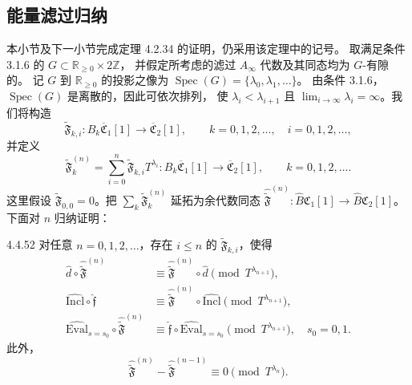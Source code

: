 \subsection{能量滤过归纳}
\label{subsec:4-4-6}

本小节及下一小节完成定理 4.2.34 的证明，仍采用该定理中的记号。
取满足条件 3.1.6 的 $G\subset\mathbb R_{\geq0}\times2\mathbb Z$，
并假定所考虑的滤过 $A_\infty$ 代数及其同态均为 $G$-有隙的。
记 $G$ 到 $\mathbb R_{\geq0}$ 的投影之像为
$\operatorname{Spec}(G)=\{\lambda_0,\lambda_1,\ldots\}$。
由条件 3.1.6，$\operatorname{Spec}(G)$ 是离散的，因此可依次排列，
使 $\lambda_i<\lambda_{i+1}$ 且
$\lim_{i\to\infty}\lambda_i=\infty$。我们将构造
\[
 \widetilde{\mathfrak F}_{k,i}\colon
 B_k\overline{\mathfrak C}_1[1]
 \longrightarrow\overline{\mathfrak C}_2[1],
 \qquad k=0,1,2,\ldots,\quad i=0,1,2,\ldots,
\]
并定义
\[
 \widetilde{\mathfrak F}^{(n)}_k
 =\sum_{i=0}^{n}\widetilde{\mathfrak F}_{k,i}T^{\lambda_i}
 \colon B_k\overline{\mathfrak C}_1[1]
 \longrightarrow\overline{\mathfrak C}_2[1],
 \qquad k=0,1,2,\ldots.
\]
这里假设 $\widetilde{\mathfrak F}_{0,0}=0$。把
$\sum_k\widetilde{\mathfrak F}^{(n)}_k$ 延拓为余代数同态
$\widehat{\widetilde{\mathfrak F}}^{(n)}\colon
\widehat B\mathfrak C_1[1]\to\widehat B\mathfrak C_2[1]$。
下面对 $n$ 归纳证明：

\begin{proposition}{4.4.52}\label{prop:4-4-52}
对任意 $n=0,1,2,\ldots$，存在 $i\leq n$ 的
$\widetilde{\mathfrak F}_{k,i}$，使得
\begin{align}
 \widehat d\circ\widehat{\widetilde{\mathfrak F}}^{(n)}
 &\equiv\widehat{\widetilde{\mathfrak F}}^{(n)}
 \circ\widehat d\pmod{T^{\lambda_{n+1}}},
 \tag{4.4.53.1}\label{eq:4-4-53-1}\\
 \widehat{\mathrm{Incl}}\circ\widehat{\mathfrak f}
 &\equiv\widehat{\widetilde{\mathfrak F}}^{(n)}
 \circ\widehat{\mathrm{Incl}}\pmod{T^{\lambda_{n+1}}},
 \tag{4.4.53.2}\label{eq:4-4-53-2}\\
 \widehat{\mathrm{Eval}}_{s=s_0}
 \circ\widehat{\widetilde{\mathfrak F}}^{(n)}
 &\equiv\widehat{\mathfrak f}
 \circ\widehat{\mathrm{Eval}}_{s=s_0}
 \pmod{T^{\lambda_{n+1}}},\quad s_0=0,1.
 \tag{4.4.53.3}\label{eq:4-4-53-3}
\end{align}
此外，
\begin{equation}
 \widehat{\widetilde{\mathfrak F}}^{(n)}
 -\widehat{\widetilde{\mathfrak F}}^{(n-1)}
 \equiv0\pmod{T^{\lambda_n}}.
\tag{4.4.53.4}\label{eq:4-4-53-4}
\end{equation}
\end{proposition}

